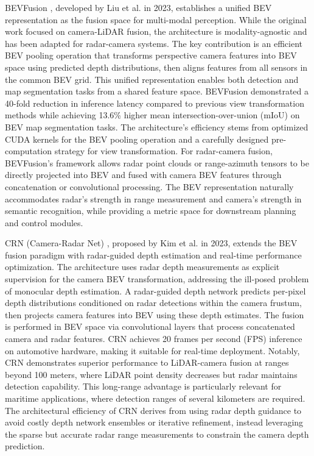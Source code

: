 BEVFusion \cite{liu2023bevfusion}, developed by Liu et al. in 2023, establishes a unified BEV representation as the fusion space for multi-modal perception. While the original work focused on camera-LiDAR fusion, the architecture is modality-agnostic and has been adapted for radar-camera systems. The key contribution is an efficient BEV pooling operation that transforms perspective camera features into BEV space using predicted depth distributions, then aligns features from all sensors in the common BEV grid. This unified representation enables both detection and map segmentation tasks from a shared feature space. BEVFusion demonstrated a 40-fold reduction in inference latency compared to previous view transformation methods while achieving 13.6\% higher mean intersection-over-union (mIoU) on BEV map segmentation tasks. The architecture's efficiency stems from optimized CUDA kernels for the BEV pooling operation and a carefully designed pre-computation strategy for view transformation. For radar-camera fusion, BEVFusion's framework allows radar point clouds or range-azimuth tensors to be directly projected into BEV and fused with camera BEV features through concatenation or convolutional processing. The BEV representation naturally accommodates radar's strength in range measurement and camera's strength in semantic recognition, while providing a metric space for downstream planning and control modules.

CRN (Camera-Radar Net) \cite{Kim2023CRN}, proposed by Kim et al. in 2023, extends the BEV fusion paradigm with radar-guided depth estimation and real-time performance optimization. The architecture uses radar depth measurements as explicit supervision for the camera BEV transformation, addressing the ill-posed problem of monocular depth estimation. A radar-guided depth network predicts per-pixel depth distributions conditioned on radar detections within the camera frustum, then projects camera features into BEV using these depth estimates. The fusion is performed in BEV space via convolutional layers that process concatenated camera and radar features. CRN achieves 20 frames per second (FPS) inference on automotive hardware, making it suitable for real-time deployment. Notably, CRN demonstrates superior performance to LiDAR-camera fusion at ranges beyond 100 meters, where LiDAR point density decreases but radar maintains detection capability. This long-range advantage is particularly relevant for maritime applications, where detection ranges of several kilometers are required. The architectural efficiency of CRN derives from using radar depth guidance to avoid costly depth network ensembles or iterative refinement, instead leveraging the sparse but accurate radar range measurements to constrain the camera depth prediction.

